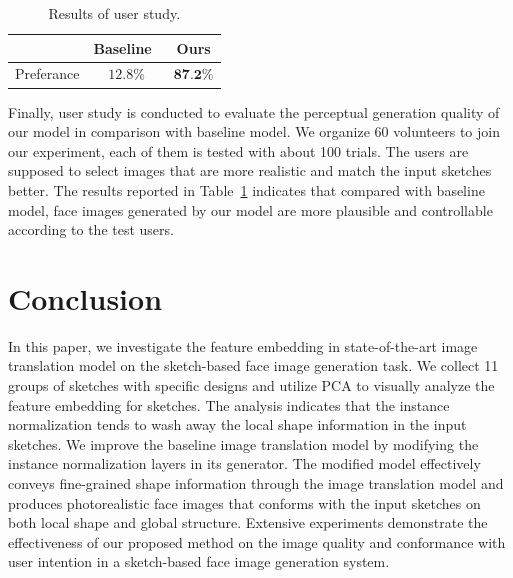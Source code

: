 \documentclass{article}
\begin{document}
\begin{table}[h]
	\centering	
	\caption{Results of user study.}
	\begin{tabular}{|c|c|c|}\hline
		& Baseline~\cite{pix2pixhd} & Ours \\\hline
		Preferance & $12.8\%$ & $\textbf{87.2\%}$\\\hline
	\end{tabular}
	\label{tab:user_study}
\end{table} 

Finally, user study is conducted to evaluate the perceptual generation quality of our model in comparison with baseline model. 
We organize 60 volunteers to join our experiment, each of them is tested with about 100 trials. The users are supposed to select images that are more realistic and match the input sketches better.  
The results reported in Table~\ref{tab:user_study} indicates that compared with baseline model, face images generated by our model are more plausible and controllable according to the test users. 

\section{Conclusion}
In this paper, we investigate the feature embedding in state-of-the-art image translation model on the sketch-based face image generation task.
We collect 11 groups of sketches with specific designs and utilize PCA to visually analyze the feature embedding for sketches.
The analysis indicates that the instance normalization tends to wash away the local shape information in the input sketches.
We improve the baseline image translation model by modifying the instance normalization layers in its generator.
The modified model effectively conveys fine-grained shape information through the image translation model and produces photorealistic face images that conforms with the input sketches on both local shape and global structure.
Extensive experiments demonstrate the effectiveness of our proposed method on the image quality and conformance with user intention in a sketch-based face image generation system.  




\end{document}
